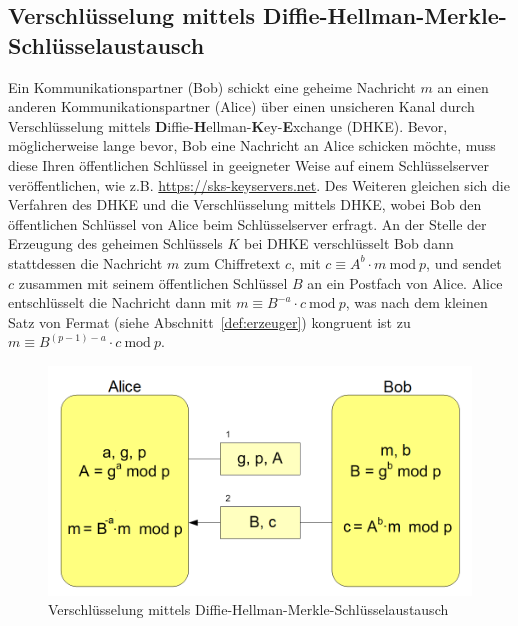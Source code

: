 \documentclass[
  a4paper,
  11pt,
]{scrartcl}
\theoremstyle{plain}
\theoremstyle{definition}
\theoremstyle{remark}
\newcommand{\Mod}[1]{\ \mathrm{mod}\ #1}
\begin{document}
\subsection{Verschlüsselung mittels Diffie-Hellman-Merkle-Schlüsselaustausch}
\label{sub:enc_with_dhke}
Ein Kommunikationspartner (Bob) schickt eine geheime Nachricht $m$ an einen
anderen Kommunikationspartner (Alice) über einen unsicheren Kanal durch
Verschlüsselung mittels
\textbf{D}iffie-\textbf{H}ellman-\textbf{K}ey-\textbf{E}xchange (DHKE). Bevor,
möglicherweise lange bevor, Bob eine Nachricht an Alice schicken möchte, muss
diese Ihren öffentlichen Schlüssel in geeigneter Weise auf einem Schlüsselserver
veröffentlichen, wie z.B. \url{https://sks-keyservers.net}. Des Weiteren
gleichen sich die Verfahren des DHKE und die Verschlüsselung mittels DHKE, wobei
Bob den öffentlichen Schlüssel von Alice beim Schlüsselserver erfragt. An der
Stelle der Erzeugung des geheimen Schlüssels $K$ bei DHKE verschlüsselt Bob dann
stattdessen die Nachricht $m$ zum Chiffretext $c$, mit $c \equiv A^b \cdot m
\Mod{p}$, und sendet $c$ zusammen mit seinem öffentlichen Schlüssel $B$ an ein
Postfach von Alice. Alice entschlüsselt die Nachricht dann mit $m \equiv
B^{-a}\cdot c  \Mod{p}$, was nach dem kleinen Satz von Fermat (siehe
Abschnitt~\ref{def:erzeuger}) kongruent ist zu $m \equiv B^{(p-1)-a}\cdot c
\Mod{p}$.

\begin{figure}[H]
  \centering
  \includegraphics[width=\textwidth]{DHKE_enc.png}
  \caption{Verschlüsselung mittels Diffie-Hellman-Merkle-Schlüsselaustausch}
  \label{fig:enc_with_dhke}
\end{figure}
\end{document}
